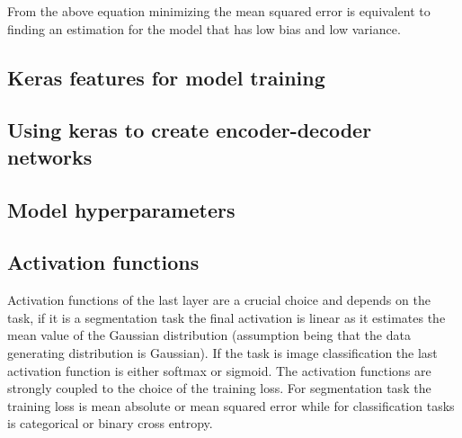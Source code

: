\documentclass[a4paper,10pt]{article}
\begin{document}
From the above equation minimizing the mean squared error is equivalent to finding an estimation for the model that has low bias and low variance.
\subsection{Keras features for model training \label{keras_train_features}}
\subsection{Using keras to create encoder-decoder networks \label{keras_net}}
\subsection{Model hyperparameters \label{model_hyp}}
\subsection{Activation functions \label{model_act}}
Activation functions of the last layer are a crucial choice and depends on the task, if it is a segmentation task the final activation is linear as it estimates the mean value of the Gaussian distribution (assumption being that the data generating distribution is Gaussian). If the task is image classification the last activation function is either softmax or sigmoid. The activation functions are strongly coupled to the choice of the training loss. For segmentation task the training loss is mean absolute or mean squared error while for classification tasks is categorical or binary cross entropy.
\end{document}

